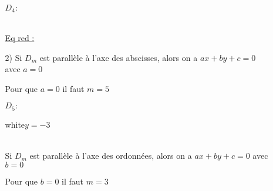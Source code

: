 \begin{enumerate}
\begin{enumerate}
        \begin{minipage}{11.2cm}   
$D_4 :$           
\end{minipage}\\
        
\underline{Eq red : } \\          

\item [2{)}]  Si $D_m$ est parallèle à l'axe des abscisses, alors on a $ax+by+c=0$ avec $a=0$ 

Pour que $a=0$ il faut $m=5$\\

\begin{minipage}{9.8cm}
$D_5 :$    
\begin{center}
  {white}{$y=-3$}
\end{center}       
        \end{minipage}\\
        
Si $D_m$ est parallèle à l'axe des ordonnées, alors on a $ax+by+c=0$ avec $b=0$ 

Pour que $b=0$ il faut $m=3$ \\


\end{enumerate}
\end{enumerate}
